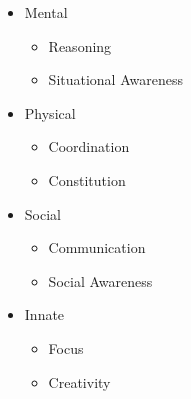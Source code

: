 \begin{itemize}[leftmargin=.5cm]
    \item Mental
	\begin{itemize}[leftmargin=.5cm]
		\item Reasoning
		\item Situational Awareness
	\end{itemize}
    \item Physical
	\begin{itemize}[leftmargin=.5cm]
		\item Coordination
		\item Constitution
	\end{itemize}
    \item Social
	\begin{itemize}[leftmargin=.5cm]
		\item Communication
		\item Social Awareness
	\end{itemize}
    \item Innate
	\begin{itemize}[leftmargin=.5cm]
		\item Focus
		\item Creativity
	\end{itemize}
\end{itemize}
